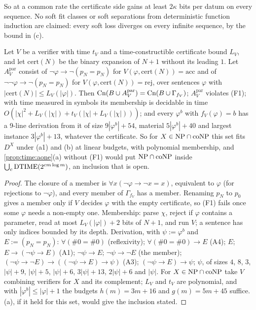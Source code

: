\noindent So at a common rate the certificate side gains at least $2\kappa$ bits per datum on every sequence. No soft fit classes or soft separations from deterministic function induction are claimed: every soft loss diverges on every infinite sequence, by the bound in (c).

\begin{proposition}\label{prop:time:channel}
Let $V$ be a verifier with time $t_V$ and a time-constructible certificate bound $L_V$, and let $\mathrm{cert}(N)$ be the binary expansion of $N+1$ without its leading $1$. Let $A^{\mathrm{par}}_V$ consist of $\neg\varphi\to\neg(p_N=p_N)$ for $V(\varphi,\mathrm{cert}(N))=\mathrm{acc}$ and of $\neg\neg\varphi\to\neg(p_N=p_N)$ for $V(\varphi,\mathrm{cert}(N))=\mathrm{rej}$, over sentences $\varphi$ with $|\mathrm{cert}(N)|\le L_V(|\varphi|)$. Then $\mathrm{Cn}(B\cup A^{\mathrm{par}}_V)=\mathrm{Cn}(B\cup\Gamma_{f_V})$; $A^{\mathrm{par}}_V$ violates (F1); with time measured in symbols its membership is decidable in time $O(|\chi|^2+L_V(|\chi|)+t_V(|\chi|+L_V(|\chi|)))$; and every $\varphi^b$ with $f_V(\varphi)=b$ has a 9-line derivation from it of size $9|\varphi^b|+54$, material $5|\varphi^b|+40$ and largest instance $3|\varphi^b|+13$, whatever the certificate. So for $X\in\mathrm{NP}\cap\mathrm{coNP}$ this set fits $D^X$ under (a1) and (b) at linear budgets, with polynomial membership, and \cref{prop:time:aone}(a) without (F1) would put $\mathrm{NP}\cap\mathrm{coNP}$ inside $\bigcup_c\mathrm{DTIME}(2^{cm\log m})$, an inclusion that is open.
\end{proposition}

\begin{proof}
The closure of a member is $\forall x(\neg\varphi\to\neg x=x)$, equivalent to $\varphi$ (for rejections to $\neg\varphi$), and every member of $\Gamma_{f_V}$ has a member. Renaming $p_N$ to $p_0$ gives a member only if $V$ decides $\varphi$ with the empty certificate, so (F1) fails once some $\varphi$ needs a non-empty one. Membership: parse $\chi$, reject if $\varphi$ contains a parameter, read at most $L_V(|\varphi|)+2$ bits of $N+1$, and run $V$; a sentence has only indices bounded by its depth. Derivation, with $\psi:=\varphi^b$ and $E:=(p_N=p_N)$: $\forall(\#0=\#0)$ (reflexivity); $\forall(\#0=\#0)\to E$ (A4); $E$; $E\to(\neg\psi\to E)$ (A1); $\neg\psi\to E$; $\neg\psi\to\neg E$ (the member); $(\neg\psi\to\neg E)\to((\neg\psi\to E)\to\psi)$ (A3); $(\neg\psi\to E)\to\psi$; $\psi$, of sizes $4$, $8$, $3$, $|\psi|+9$, $|\psi|+5$, $|\psi|+6$, $3|\psi|+13$, $2|\psi|+6$ and $|\psi|$. For $X\in\mathrm{NP}\cap\mathrm{coNP}$ take $V$ combining verifiers for $X$ and its complement; $L_V$ and $t_V$ are polynomial, and with $|\varphi^b|\le|\varphi|+1$ the budgets $h(m)=3m+16$ and $g(m)=5m+45$ suffice. (a), if it held for this set, would give the inclusion stated.
\end{proof}

